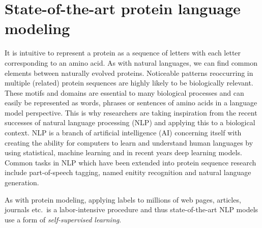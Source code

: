 \section{State-of-the-art protein language modeling}
It is intuitive to represent a protein as a sequence of letters with each letter corresponding to an amino acid. As with natural languages, we can find common elements between naturally evolved proteins. Noticeable patterns reoccurring in multiple (related) protein sequences are highly likely to be biologically relevant. These motifs and domains are essential to many biological processes and can easily be represented as words, phrases or sentences of amino acids in a language model perspective. This is why researchers are taking inspiration from the recent successes of natural language processing (NLP) and applying this to a biological context. NLP is a branch of artificial intelligence (AI) concerning itself with creating the ability for computers to learn and understand human languages by using statistical, machine learning and in recent years deep learning models. Common tasks in NLP which have been extended into protein sequence research include part-of-speech tagging, named enitity recognition and natural language generation.

As with protein modeling, applying labels to millions of web pages, articles, journals etc.\ is a labor-intensive procedure and thus state-of-the-art NLP models use a form of \textit{self-supervised learning}.